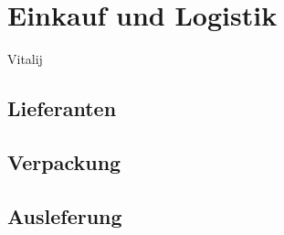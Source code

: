 
\section{Einkauf und Logistik}
Vitalij
\subsection{Lieferanten}
\subsection{Verpackung}
\subsection{Ausleferung}